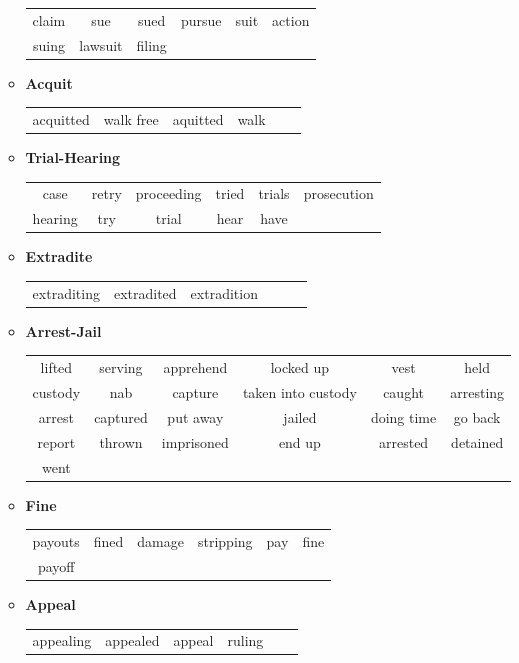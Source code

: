 \documentclass[11pt, oneside]{article}   	%
\begin{document}
\begin{itemize}
\begin{itemize}
\begin{tabular}{ c c c c c c }
		 claim & sue & sued & pursue & suit & action\\suing & lawsuit & filing
		 \end{tabular} 
	\item[] \textbf{Acquit} \\
		 \begin{tabular}{ c c c c c c }	
		 acquitted & walk free & aquitted & walk
		 \end{tabular} 
	\item[] \textbf{Trial-Hearing} \\
		 \begin{tabular}{ c c c c c c }	
		 case & retry & proceeding & tried & trials & prosecution\\hearing & try & trial & hear & have\\
		 \end{tabular} 
	\item[] \textbf{Extradite} \\
		 \begin{tabular}{ c c c c c c }	
		 extraditing & extradited & extradition
		 \end{tabular} 
	\item[] \textbf{Arrest-Jail} \\
		 \begin{tabular}{ c c c c c c }	
		 lifted & serving & apprehend & locked up & vest & held\\custody & nab & capture & taken into
custody & caught & arresting\\arrest & captured & put away & jailed & doing time & go back\\report & thrown & imprisoned & end up & arrested & detained\\went\\

		 \end{tabular} 
	\item[] \textbf{Fine} \\
		 \begin{tabular}{ c c c c c c }	
		 payouts & fined & damage & stripping & pay & fine\\payoff
		 \end{tabular} 
	\item[] \textbf{Appeal} \\
		 \begin{tabular}{ c c c c c c }	
		 appealing & appealed & appeal & ruling
		 \end{tabular} 
	\end{itemize}


\end{itemize}
\end{document}
